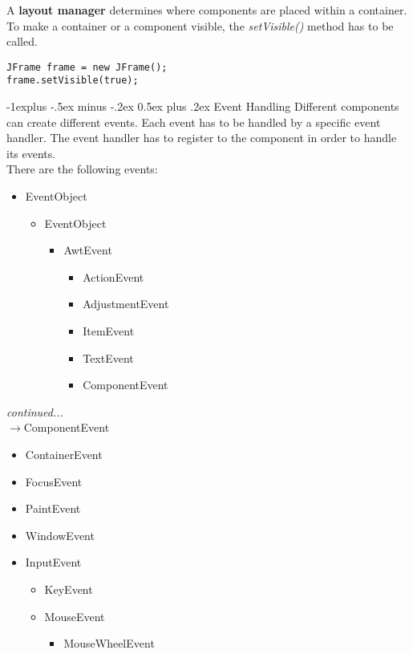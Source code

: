 \documentclass[10pt,landscape]{article}
\makeatletter
\renewcommand{\subsection}{\@startsection{subsection}{2}{0mm}%
                                {-1explus -.5ex minus -.2ex}%
                                {0.5ex plus .2ex}%
                                {\normalfont\normalsize\bfseries}}
\makeatother
\begin{document}
\begin{multicols}{3}
A \textbf{layout manager} determines where components are placed within a container.\\
To make a container or a component visible, the \textit{setVisible()} method has to be called.
\begin{lstlisting}
JFrame frame = new JFrame();
frame.setVisible(true);
\end{lstlisting}

\subsection{Event Handling}
Different components can create different events. Each event has to be handled by a specific event handler. The event handler has to register to the component in order to handle its events.\\
There are the following events:
\begin{itemize}
  \item EventObject
  \begin{itemize}
    \item EventObject
    \begin{itemize}
      \item AwtEvent
      \begin{itemize}
		\item ActionEvent
		\item AdjustmentEvent
		\item ItemEvent
		\item TextEvent
		\item ComponentEvent
	  \end{itemize}
    \end{itemize}
  \end{itemize}
\end{itemize}

\textit{continued...}\\
$\rightarrow$ComponentEvent
\begin{itemize}
  \item ContainerEvent
  \item FocusEvent
  \item PaintEvent
  \item WindowEvent
  \item InputEvent
  \begin{itemize}
	\item KeyEvent
	\item MouseEvent
	\begin{itemize}
	  \item MouseWheelEvent
	\end{itemize}
  \end{itemize}
\end{itemize}


\end{multicols}
\end{document}
